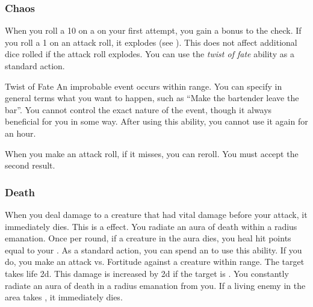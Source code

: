         \subsubsection{Chaos}
             When you roll a 10 on a  on your first attempt, you gain a  bonus to the check.
             If you roll a 1 on an attack roll, it explodes (see ).
            This does not affect additional dice rolled if the attack roll explodes.
             You can use the \textit{twist of fate} ability as a standard action.
            \begin{apability}{Twist of Fate}
                An improbable event occurs within \rnglong range.
                You can specify in general terms what you want to happen, such as ``Make the bartender leave the bar''.
                You cannot control the exact nature of the event, though it always beneficial for you in some way.
                After using this ability, you cannot use it again for an hour.
            \end{apability}
             When you make an attack roll, if it misses, you can reroll.
            You must accept the second result.

        \subsubsection{Death}
             When you deal damage to a creature that had vital damage before your attack, it immediately dies.
            This is a  effect.
             You radiate an aura of death within a \arealarge radius emanation.
            Once per round, if a creature in the aura dies, you heal hit points equal to your .
             As a standard action, you can spend an  to use this ability.
            If you do, you make an attack vs. Fortitude against a creature within \rngmed range.
            \hit The target takes life  \plus2d.
            This damage is increased by \plus2d if the target is .
             You constantly radiate an aura of death in a \areahuge radius emanation from you.
            If a living enemy in the area takes , it immediately dies.

